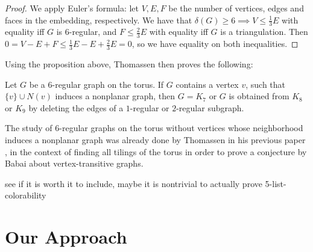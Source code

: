 \begin{proof}
We apply Euler's formula: let $V, E, F$ be the number of vertices, edges and faces in the embedding, respectively. 
We have that $\delta(G) \geq 6 \implies V \leq \frac{1}{3} E$ with equality iff $G$ is $6$-regular, and $F \leq \frac{2}{3}E$ 
with equality iff $G$ is a triangulation. Then $0 = V - E + F \leq \frac{1}{3}E - E + \frac{2}{3}E = 0$, so we have equality on both inequalities.
\end{proof}

Using the proposition above, Thomassen then proves the following:

\begin{proposition}
Let $G$ be a $6$-regular graph on the torus. If $G$ contains a vertex $v$, such that $\{v\} \cup N(v)$ induces a nonplanar graph, then $G = K_7$ or $G$ is obtained from $K_8$ or $K_9$ by deleting the edges of a $1$-regular or $2$-regular subgraph.
\end{proposition}

The study of $6$-regular graphs on the torus without vertices whose neighborhood induces a nonplanar graph was already done by Thomassen in his previous paper \cite{thomassentilings}, in the context of finding all tilings of the torus in order to prove a conjecture by Babai about vertex-transitive graphs. 


 see if it is worth it to include, maybe it is nontrivial to actually prove 5-list-colorability




\section{Our Approach}
